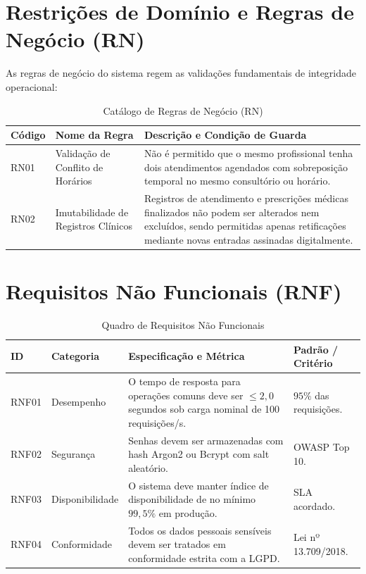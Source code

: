 \section{Restrições de Domínio e Regras de Negócio (RN)}
As regras de negócio do sistema regem as validações fundamentais de integridade operacional:

\begin{table}[htbp]
\caption{Catálogo de Regras de Negócio (RN)}
\label{tab:regras_negocio}
\centering
\small
\renewcommand{\arraystretch}{1.25}
\begin{tabularx}{\textwidth}{@{} l l Y @{}}
\toprule
\textbf{Código} & \textbf{Nome da Regra} & \textbf{Descrição e Condição de Guarda} \\
\midrule
RN01 & Validação de Conflito de Horários & Não é permitido que o mesmo profissional tenha dois atendimentos agendados com sobreposição temporal no mesmo consultório ou horário. \\
RN02 & Imutabilidade de Registros Clínicos & Registros de atendimento e prescrições médicas finalizados não podem ser alterados nem excluídos, sendo permitidas apenas retificações mediante novas entradas assinadas digitalmente. \\
\bottomrule
\end{tabularx}
\end{table}

\section{Requisitos Não Funcionais (RNF)}
\begin{table}[htbp]
\caption{Quadro de Requisitos Não Funcionais}
\label{tab:requisitos_nao_funcionais}
\centering
\small
\begin{tabularx}{\textwidth}{@{} l l Y l @{}}
\toprule
\textbf{ID} & \textbf{Categoria} & \textbf{Especificação e Métrica} & \textbf{Padrão / Critério} \\
\midrule
RNF01 & Desempenho & O tempo de resposta para operações comuns deve ser $\le 2{,}0$ segundos sob carga nominal de 100 requisições/s. & $95\%$ das requisições. \\
RNF02 & Segurança & Senhas devem ser armazenadas com hash Argon2 ou Bcrypt com salt aleatório. & OWASP Top 10. \\
RNF03 & Disponibilidade & O sistema deve manter índice de disponibilidade de no mínimo $99{,}5\%$ em produção. & SLA acordado. \\
RNF04 & Conformidade & Todos os dados pessoais sensíveis devem ser tratados em conformidade estrita com a LGPD. & Lei nº 13.709/2018. \\
\bottomrule
\end{tabularx}
\end{table}
